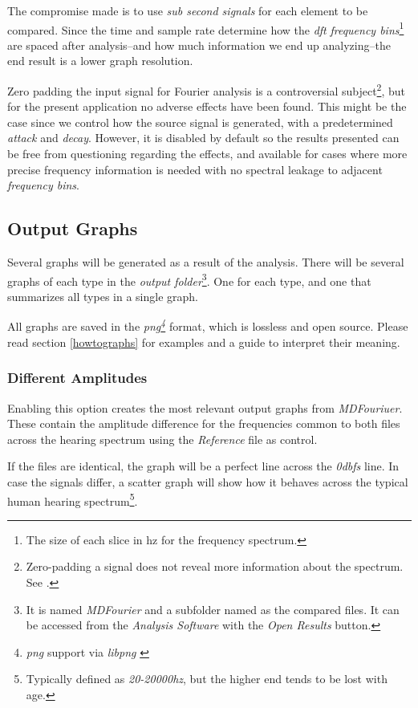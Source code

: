 \documentclass[10pt,a4paper]{report}
\newcommand{\defineCite}[2]{\textit{\acrshort{#1}\footnote{\textit{\acrlong{#1}} #2}}}
\newcommand{\ac}[1]{\textit{\acrshort{#1}}}
\newcommand{\hz}[1]{\textit{#1\acrshort{hz}}}
\newcommand{\db}[1]{\textit{#1\acrshort{dbfs}}}
\begin{document}
\begin{appendices}
The compromise made is to use \textit{sub second signals} for each element to be compared. Since the time and sample rate determine how the \ac{dft} \textit{frequency bins}\footnote{The size of each slice in \acrlong{hz} for the frequency spectrum.} are spaced after analysis--and how much information we end up analyzing--the end result is a lower graph resolution.

Zero padding the input signal for Fourier analysis is a controversial subject\footnote{Zero-padding a signal does not reveal more information about the spectrum. See \cite{zeropaddinginterpolate} \cite{ZeroPaddingBad}.}, but for the present application no adverse effects have been found. This might be the case since we control how the source signal is generated, with a predetermined \textit{attack} and \textit{decay}. However, it is disabled by default so the results presented can be free from questioning regarding the effects, and available for cases where more precise frequency information is needed with no spectral leakage to adjacent \textit{frequency bins}.

\subsection{Output Graphs}
\label{outputfiles}

Several graphs will be generated as a result of the analysis. There will be several graphs of each type in the \textit{output folder}\footnote{It is named \textit{MDFourier} and a subfolder named as the compared files. It can be accessed from the \textit{Analysis Software} with the \textit{Open Results} button.}. One for each type, and one that summarizes all types in a single graph.

All graphs are saved in the \defineCite{png}{support via \textit{libpng} \cite{libpng}} format, which is lossless and open source. Please read section \ref{howtographs} for examples and a guide to interpret their meaning. 

\subsubsection{Different Amplitudes}

Enabling this option creates the most relevant output graphs from \textit{MDFouriuer}. These contain the amplitude difference for the frequencies common to both files across the hearing spectrum using the \textit{Reference} file as control.

If the files are identical, the graph will be a perfect line across the \db{0} line. In case the signals differ, a scatter graph will show how it behaves across the typical human hearing spectrum\footnote{Typically defined as \hz{20-20000}, but the higher end tends to be lost with age.}.


\end{appendices}
\end{document}
